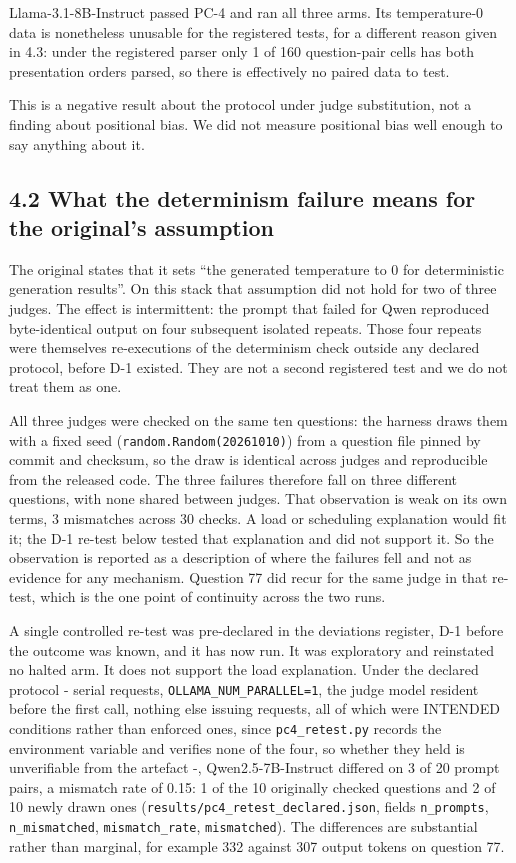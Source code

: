 Llama-3.1-8B-Instruct passed PC-4 and ran all three arms. Its temperature-0 data is nonetheless
unusable for the registered tests, for a different reason given in 4.3: under the registered parser
only 1 of 160 question-pair cells has both presentation orders parsed, so there is effectively no
paired data to test.

This is a negative result about the protocol under judge substitution, not a finding about
positional bias. We did not measure positional bias well enough to say anything about it.

\subsection{4.2 What the determinism failure means for the original's assumption}\label{what-the-determinism-failure-means-for-the-originals-assumption}

The original states that it sets ``the generated temperature to 0 for deterministic generation
results''. On this stack that assumption did not hold for two of three judges. The effect is
intermittent: the prompt that failed for Qwen reproduced byte-identical output on four subsequent
isolated repeats. Those four repeats were themselves re-executions of the determinism check outside
any declared protocol, before D-1 existed. They are not a second registered test and we do not
treat them as one.

All three judges were checked on the same ten questions: the harness draws them with a fixed seed
(\texttt{random.Random(20261010)}) from a question file pinned by commit and checksum, so the draw is
identical across judges and reproducible from the released code. The three failures therefore fall
on three different questions, with none shared between judges. That observation is weak on its own
terms, 3 mismatches across 30 checks. A load or scheduling explanation would fit it; the D-1 re-test
below tested that explanation and did not support it. So the observation is reported as a
description of where the failures fell and not as evidence for any mechanism. Question 77 did recur
for the same judge in that re-test, which is the one point of continuity across the two runs.

A single controlled re-test was pre-declared in the deviations register, D-1 before the outcome was known,
and it has now run. It was exploratory and reinstated no halted arm. It does not support the load
explanation. Under the declared protocol - serial requests, \texttt{OLLAMA\_NUM\_PARALLEL=1}, the judge model
resident before the first call, nothing else issuing requests, all of which were INTENDED
conditions rather than enforced ones, since \texttt{pc4\_retest.py} records the environment variable
and verifies none of the four, so whether they held is unverifiable from the artefact -, Qwen2.5-7B-Instruct differed on
3 of 20 prompt pairs, a mismatch rate of 0.15: 1 of the 10 originally checked questions and 2 of 10
newly drawn ones
(\texttt{results/pc4\_retest\_declared.json}, fields \texttt{n\_prompts}, \texttt{n\_mismatched}, \texttt{mismatch\_rate},
\texttt{mismatched}). The differences are substantial rather than marginal, for example 332 against 307
output tokens on question 77.

